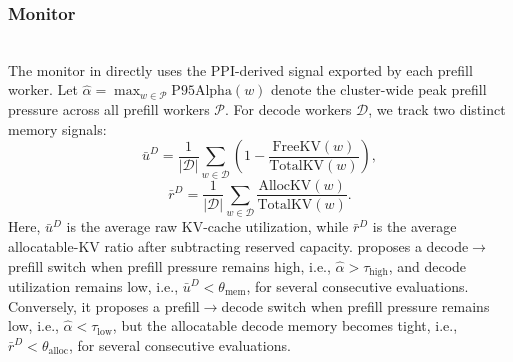 \subsubsection{Monitor}
\noindent\\

The monitor in \cluster directly uses the PPI-derived signal exported by each prefill worker.
Let $\hat{\alpha}=\max_{w\in\mathcal{P}}\mathrm{P95Alpha}(w)$ denote the cluster-wide peak prefill pressure across all prefill workers $\mathcal{P}$.
For decode workers $\mathcal{D}$, we track two distinct memory signals:
\begin{equation}
    \bar{u}^{D} = \frac{1}{|\mathcal{D}|}\sum_{w\in\mathcal{D}}\left(1-\frac{\mathrm{FreeKV}(w)}{\mathrm{TotalKV}(w)}\right),
\end{equation}
\begin{equation}
    \bar{r}^{D} = \frac{1}{|\mathcal{D}|}\sum_{w\in\mathcal{D}}\frac{\mathrm{AllocKV}(w)}{\mathrm{TotalKV}(w)}.
\end{equation}
Here, $\bar{u}^{D}$ is the average raw KV-cache utilization, while $\bar{r}^{D}$ is the average allocatable-KV ratio after subtracting reserved capacity.
\cluster proposes a decode$\rightarrow$prefill switch when prefill pressure remains high, i.e., $\hat{\alpha}>\tau_{\mathrm{high}}$, and decode utilization remains low, i.e., $\bar{u}^{D}<\theta_{\mathrm{mem}}$, for several consecutive evaluations.
Conversely, it proposes a prefill$\rightarrow$decode switch when prefill pressure remains low, i.e., $\hat{\alpha}<\tau_{\mathrm{low}}$, but the allocatable decode memory becomes tight, i.e., $\bar{r}^{D}<\theta_{\mathrm{alloc}}$, for several consecutive evaluations.

